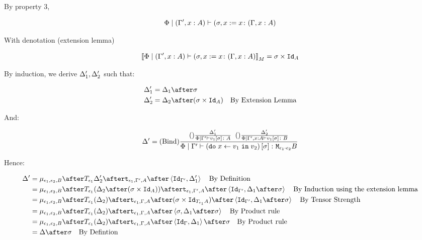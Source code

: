 \documentclass{report}
\begin{document}
By property 3,

\begin{equation}
    \Phi\mid(\Gamma', x:A) \vdash (\sigma, x:= x \colon (\Gamma, x: A)
\end{equation}

With denotation (extension lemma)

\begin{equation}
    {\bf [\![}\Phi\mid(\Gamma', x:A) \vdash (\sigma, x:= x \colon (\Gamma, x: A){\bf ]\!]}_M = \sigma\times\texttt{Id}_{A}
\end{equation}

By induction, we derive $\Delta_1', \Delta_2'$ such that:

\begin{align}
    \D_1' & = \D_1\after \si\\
    \D_2' & = \D_2\after (\si\times\Id{A})\qt{By Extension Lemma}
\end{align}

And:

\begin{equation}
    \Delta' = (\text{Bind}) \frac{
        (\text{}) \frac{\Delta_1'}{\Phi\mid\Gamma' \vdash v_1\left[\sigma\right] \colon A}
        \;\;
        (\text{}) \frac{\Delta_2'}{\Phi\mid\Gamma', x:A  \vdash v_1\left[\sigma\right] \colon B}
    }{
        \Phi\mid\Gamma' \vdash (\texttt{do}\; x \leftarrow v_1 \;\texttt{in}\; v_2)\left[\sigma\right] \colon \texttt{M}_{\epsilon_1\cdot\epsilon_2}{B}
    }
\end{equation}

Hence:

\begin{align}
    \D' & = \bind{\e_1}{\e_2}{B}\after\T{\e_1}{\D_2'}\after\tstrength{\e_1}{\G'}{A}\after\pr{\Id{\G'}}{\D_1'}\qt{By Definition}\\
    & = \bind{\e_1}{\e_2}{B}\after\T{\e_1}{(\D_2\after(\si\times\Id{A}))}\after\tstrength{\e_1}{\G'}{A}\after\pr{\Id{\G'}}{\D_1\after\si}\qt{By Induction using the extension lemma}\\
    & = \bind{\e_1}{\e_2}{B}\after\T{\e_1}{(\D_2)}\after\tstrength{\e_1}{\G}{A}\after(\si\times\Id{\T{\e_1}{A}})\after\pr{\Id{\G'}}{\D_1\after\si}\qt{By Tensor Strength}\\
    & = \bind{\e_1}{\e_2}{B}\after\T{\e_1}{(\D_2)}\after\tstrength{\e_1}{\G}{A}\after\pr{\si}{\D_1\after\si}\qt{By Product rule}\\
    & = \bind{\e_1}{\e_2}{B}\after\T{\e_1}{(\D_2)}\after\tstrength{\e_1}{\G}{A}\after\pr{\idg}{\D_1}\after\si\qt{By Product rule}\\
    &= \D\after\si\qt{By Defintion}\\
\end{align}
\end{document}
